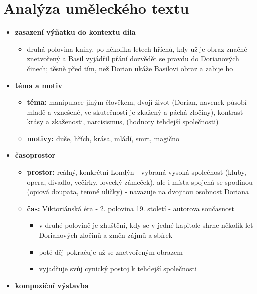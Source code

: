 \documentclass[11pt]{article}
\begin{document}
    \section*{Analýza uměleckého textu}
    \begin{itemize}
        \item\textbf{zasazení výňatku do kontextu díla}
        \begin{itemize}
            \item druhá polovina knihy, po několika letech hříchů, kdy už je obraz značně znetvořený a Basil vyjádřil přání dozvědět se pravdu do Dorianových činech; těsně před tím, než Dorian ukáže Basilovi obraz a zabije ho
        \end{itemize}
        \item\textbf{téma a motiv}
        \begin{itemize}
            \item\textbf{téma: }manipulace jiným člověkem, dvojí život (Dorian, navenek působí mladě a vznešeně, ve skutečnosti je zkažený a páchá zločiny), kontrast krásy a zkaženosti, narcisismus, (hodnoty tehdejší společnosti)
            \item\textbf{motivy: }duše, hřích, krása, mládí, smrt, magično
        \end{itemize}
        \item\textbf{časoprostor}
        \begin{itemize}
            \item\textbf{prostor: }reálný, konkrétní Londýn - vybraná vysoká společnost (kluby, opera, divadlo, večírky, lovecký zámeček), ale i místa spojená se spodinou (opiová doupata, temné uličky) - navazuje na dvojitou osobnost Doriana
            \item\textbf{čas: }Viktoriánská éra - 2. polovina 19. století - autorova současnost
            \begin{itemize}
                \item v druhé polovině je zhuštění, kdy se v jedné kapitole shrne několik let Dorianových zločinů a změn zájmů a sbírek
                \item poté děj pokračuje už se znetvořeným obrazem
                \item vyjadřuje svůj cynický postoj k tehdejší společnosti
            \end{itemize}
        \end{itemize}
        \item\textbf{kompoziční výstavba}
        \begin{itemize}

\end{itemize}
\end{itemize}
\end{document}
